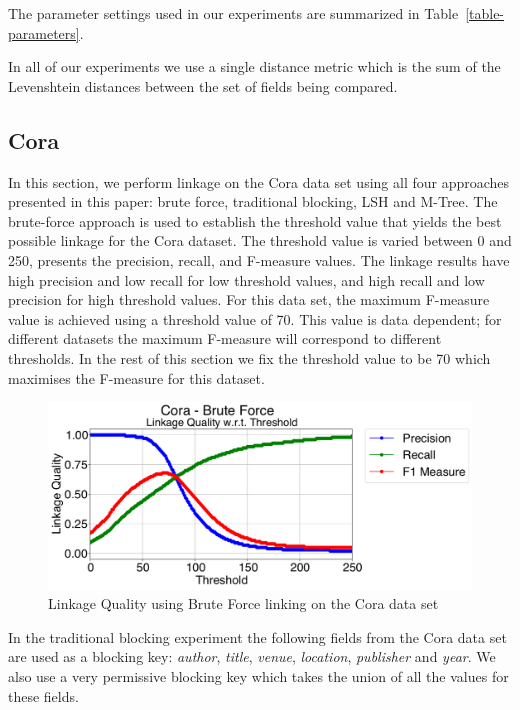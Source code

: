 \documentclass{llncs}
\begin{document}
The parameter settings used in our experiments are summarized in
Table~\ref{table-parameters}.

In all of our experiments we use a single distance metric which is the sum of the Levenshtein distances between the set of fields being compared.

\subsection{Cora}

In this section, we perform linkage on the Cora data set using all four approaches presented in this paper: brute force, traditional blocking, LSH and M-Tree.
The brute-force approach is used to establish the threshold value that yields the best possible linkage for the Cora dataset. The threshold value is varied between 0 and 250,  presents the precision, recall, and F-measure values. 
The linkage results have high precision and low recall for low threshold values, and high recall and low precision for high threshold values.
For this data set, the maximum F-measure value is achieved using a threshold value of 70. This value is data dependent; for different datasets the maximum F-measure will correspond to different thresholds. 
In the rest of this section we fix the threshold value to be 70 which maximises the F-measure for this dataset.

\begin{figure}
\includegraphics[width=\textwidth]{figures/plotLQ_--_Cora_-_Brute_Force.png}
\caption{Linkage Quality using Brute Force linking on the Cora data set\label{fig-cora-brute}}
\end{figure}

In the traditional blocking experiment the following fields from the Cora data set are used as a blocking key: \textit{author}, \textit{title}, \textit{venue}, \textit{location}, \textit{publisher} and \textit{year}. We also use a very permissive blocking key which takes the union of all the values for these fields. 
\end{document}
